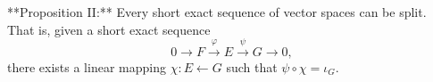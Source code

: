 **Proposition II:** Every short exact sequence of vector spaces can be split. That is, given a short exact sequence
$$0 \to F \xrightarrow{\varphi} E \xrightarrow{\psi} G \to 0,$$
there exists a linear mapping $\chi: E \leftarrow G$ such that $\psi \circ \chi = \iota_G$.
